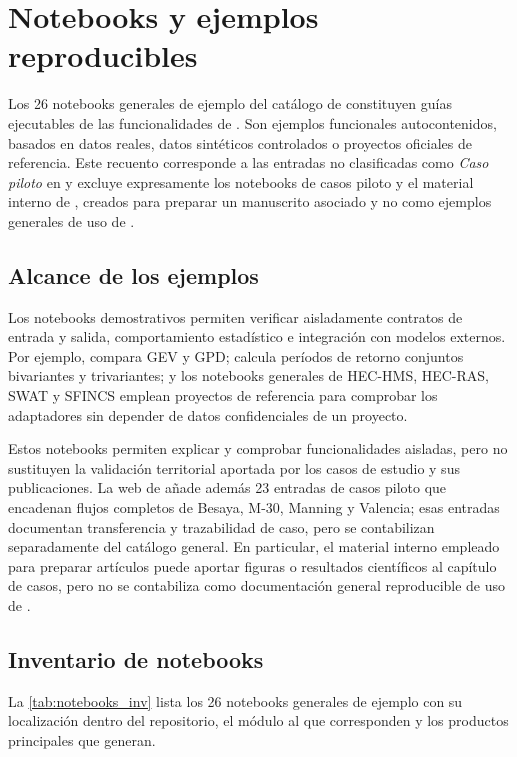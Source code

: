 \chapter{Notebooks y ejemplos reproducibles}
\label{app:notebooks}

Los 26 notebooks generales de ejemplo del catálogo de \hydra constituyen guías ejecutables de las funcionalidades de \pyhydra. Son ejemplos funcionales autocontenidos, basados en datos reales, datos sintéticos controlados o proyectos oficiales de referencia. Este recuento corresponde a las entradas no clasificadas como \emph{Caso piloto} en  y excluye expresamente los notebooks de casos piloto y el material interno de , creados para preparar un manuscrito asociado y no como ejemplos generales de uso de \hydra.

\section{Alcance de los ejemplos}

Los notebooks demostrativos permiten verificar aisladamente contratos de entrada y salida, comportamiento estadístico e integración con modelos externos. Por ejemplo,  compara GEV y GPD;  calcula períodos de retorno conjuntos bivariantes y trivariantes; y los notebooks generales de HEC-HMS, HEC-RAS, SWAT y SFINCS emplean proyectos de referencia para comprobar los adaptadores sin depender de datos confidenciales de un proyecto.

Estos notebooks permiten explicar y comprobar funcionalidades aisladas, pero no sustituyen la validación territorial aportada por los casos de estudio y sus publicaciones. La web de \hydra añade además 23 entradas de casos piloto que encadenan flujos completos de Besaya, M-30, Manning y Valencia; esas entradas documentan transferencia y trazabilidad de caso, pero se contabilizan separadamente del catálogo general. En particular, el material interno empleado para preparar artículos puede aportar figuras o resultados científicos al capítulo de casos, pero no se contabiliza como documentación general reproducible de uso de \hydra.

\section{Inventario de notebooks}

La \cref{tab:notebooks_inv} lista los 26 notebooks generales de ejemplo con su localización dentro del repositorio, el módulo al que corresponden y los productos principales que generan.

